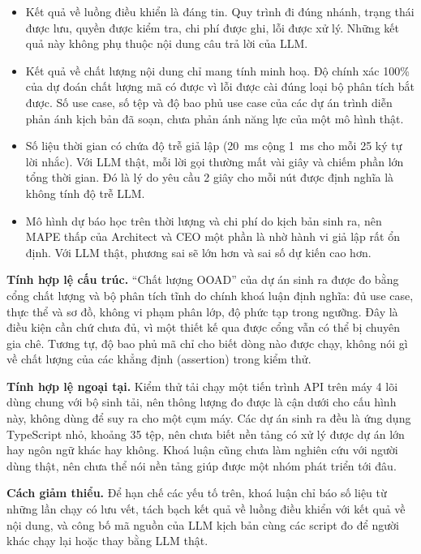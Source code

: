 \begin{itemize}
\item Kết quả về luồng điều khiển là đáng tin. Quy trình đi đúng nhánh, trạng thái được lưu, quyền được kiểm tra, chi phí được ghi, lỗi được xử lý. Những kết quả này không phụ thuộc nội dung câu trả lời của LLM.
\item Kết quả về chất lượng nội dung chỉ mang tính minh hoạ. Độ chính xác 100\% của dự đoán chất lượng mã có được vì lỗi được cài đúng loại bộ phân tích bắt được. Số use case, số tệp và độ bao phủ use case của các dự án trình diễn phản ánh kịch bản đã soạn, chưa phản ánh năng lực của một mô hình thật.
\item Số liệu thời gian có chứa độ trễ giả lập (20~ms cộng 1~ms cho mỗi 25 ký tự lời nhắc). Với LLM thật, mỗi lời gọi thường mất vài giây và chiếm phần lớn tổng thời gian. Đó là lý do yêu cầu 2 giây cho mỗi nút được định nghĩa là không tính độ trễ LLM.
\item Mô hình dự báo học trên thời lượng và chi phí do kịch bản sinh ra, nên MAPE thấp của Architect và CEO một phần là nhờ hành vi giả lập rất ổn định. Với LLM thật, phương sai sẽ lớn hơn và sai số dự kiến cao hơn.
\end{itemize}

\textbf{Tính hợp lệ cấu trúc.} ``Chất lượng OOAD'' của dự án sinh ra được đo bằng cổng chất lượng và bộ phân tích tĩnh do chính khoá luận định nghĩa: đủ use case, thực thể và sơ đồ, không vi phạm phân lớp, độ phức tạp trong ngưỡng. Đây là điều kiện cần chứ chưa đủ, vì một thiết kế qua được cổng vẫn có thể bị chuyên gia chê. Tương tự, độ bao phủ mã chỉ cho biết dòng nào được chạy, không nói gì về chất lượng của các khẳng định (assertion) trong kiểm thử.

\textbf{Tính hợp lệ ngoại tại.} Kiểm thử tải chạy một tiến trình API trên máy 4 lõi dùng chung với bộ sinh tải, nên thông lượng đo được là cận dưới cho cấu hình này, không dùng để suy ra cho một cụm máy. Các dự án sinh ra đều là ứng dụng TypeScript nhỏ, khoảng 35 tệp, nên chưa biết nền tảng có xử lý được dự án lớn hay ngôn ngữ khác hay không. Khoá luận cũng chưa làm nghiên cứu với người dùng thật, nên chưa thể nói nền tảng giúp được một nhóm phát triển tới đâu.

\textbf{Cách giảm thiểu.} Để hạn chế các yếu tố trên, khoá luận chỉ báo số liệu từ những lần chạy có lưu vết, tách bạch kết quả về luồng điều khiển với kết quả về nội dung, và công bố mã nguồn của LLM kịch bản cùng các script đo để người khác chạy lại hoặc thay bằng LLM thật.

